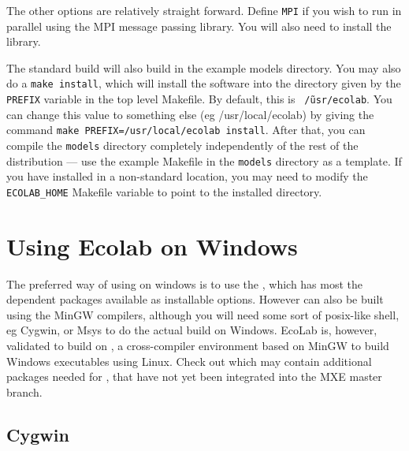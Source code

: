 The other options are relatively straight forward.  
Define {\tt MPI} if you wish to run \EcoLab{} in parallel
using the MPI message passing library. You will also need to install
the
library.

The standard build will also build in the example models directory.
You may also do a {\tt make install}, which will install the \EcoLab{}
software into the directory given by the {\tt PREFIX}
variable in the top level Makefile. By default, this is {\tt
  \~/usr/ecolab}. You can change this value to something else (eg
/usr/local/ecolab) by giving the command {\tt make
  PREFIX=/usr/local/ecolab install}. After that, you can compile the
{\tt models} directory completely independently of the rest of the
distribution --- use the example Makefile in the {\tt models}
directory as a template. If you have installed \EcoLab{} in a
non-standard location, you may need to modify the {\tt ECOLAB\_HOME}
Makefile variable to point to the installed directory.

\section{Using Ecolab on Windows}

The preferred way of using \EcoLab{} on windows is to use the , which has most the dependent packages
available as installable options. However \EcoLab{} can also be built
using the MinGW compilers, although you will need some sort of
posix-like shell, eg Cygwin, or Msys to do the actual build on
Windows. EcoLab{} is, however, validated to build on
, a cross-compiler
environment based on MinGW to build Windows executables using Linux. Check out
 which may contain
additional packages needed for \EcoLab{}, that have not yet been
integrated into the MXE master branch.

\subsection{Cygwin}


